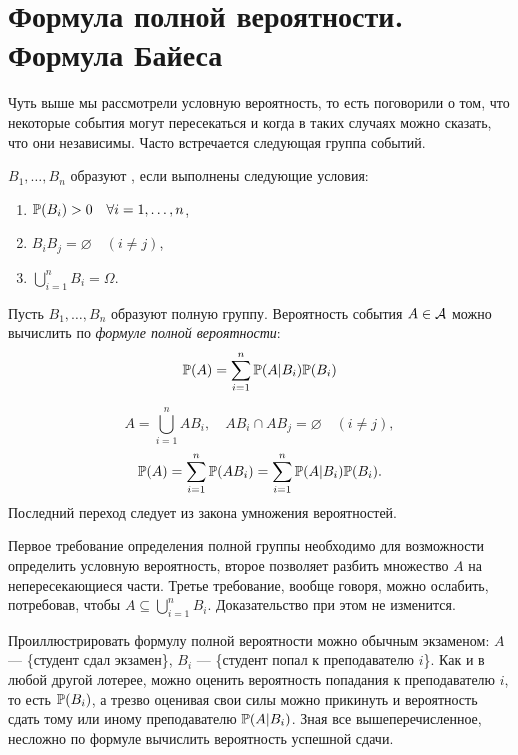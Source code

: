 \documentclass[../TV&MS.tex]{subfiles}
\begin{document}
    
\section{Формула полной вероятности. Формула Байеса}

\qquad Чуть выше мы рассмотрели условную вероятность, то есть поговорили о том, что
некоторые события могут пересекаться и когда в таких случаях можно сказать, что они
независимы. Часто встречается следующая группа событий.	
	
\begin{Def}
$B_1, \ldots, B_n$ образуют , если выполнены следующие условия:
	\begin{enumerate}
		\item $\mathbb{P}(B_i) > 0 \quad \forall i = 1, \ldots, n$,
		\item $B_iB_j = \varnothing \quad (i \not= j)$,
		\item $\bigcup\limits_{i=1}^nB_i = \Omega$.
	\end{enumerate}
\end{Def}

\begin{Th}
Пусть $B_1, \ldots, B_n$ образуют полную группу. Вероятность события $A \in \mathcal{A}$ можно 
вычислить по \emph{формуле полной вероятности}:
$$\mathbb{P}(A) = \sum\limits_{i=1}^{n} \mathbb{P}(A|B_i)\mathbb{P}(B_i)$$
\end{Th}

\begin{Proof}
$$A=\bigcup\limits_{i=1}^{n}AB_i, \quad AB_i \cap AB_j = \varnothing \quad (i \not= j),$$
$$\mathbb{P}(A) = \sum\limits_{i=1}^n \mathbb{P}(AB_i) = \sum\limits_{i=1}^{n} \mathbb{P}(A|B_i)\mathbb{P}(B_i).$$
Последний переход следует из  закона умножения вероятностей.
\end{Proof}

Первое требование определения полной группы необходимо для возможности определить 
условную вероятность, второе позволяет разбить множество $A$ на непересекающиеся части. 
Третье требование, вообще говоря, можно ослабить, потребовав, чтобы 
$A \subseteq \bigcup\limits_{i=1}^nB_i$. Доказательство при этом не изменится. \\

\begin{Ex}
Проиллюстрировать формулу полной вероятности можно обычным экзаменом: $A$ --- \{студент сдал экзамен\}, 
$B_i$ --- \{студент попал к преподавателю $i$\}. Как и в любой другой лотерее, можно оценить вероятность 
попадания к преподавателю $i$, то есть $\mathbb{P}(B_i)$, а трезво оценивая свои силы можно прикинуть 
и вероятность сдать тому или иному преподавателю $\mathbb{P}(A|B_i)$. Зная все вышеперечисленное, 
несложно по формуле вычислить вероятность успешной сдачи.
\end{Ex}
\end{document}
